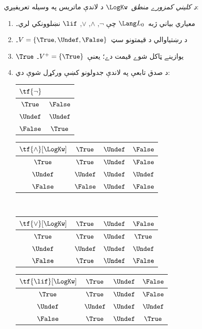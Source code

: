 \documentclass[../../../include/open-logic-section]{subfiles}
\begin{document}
\begin{defn}
\emph{د کليني کمزورے منطق}~$\LogKw$ د لاندې ماتريس په وسيله تعريفېږي:
\begin{enumerate}
  \item معياري بياني ژبه~$\Lang L_0$ چې
  $\lnot$, $\land$, $\lor$, $\lif$ نښلوونکي لري۔
  \item د رښتياوالي د قيمتونو سټ~$V = \{\True, \Undef, \False\}$۔
  \item $\True$ يوازينے ټاکل شوے قيمت دے؛ يعنې~$V^+ = \{\True\}$۔
  \item د صدق تابعې په لاندې جدولونو کښې ورکړل شوې دي:
  \begin{center}
    \begin{tabular}{c|c} 
      $\tf{\lnot}$ & \\ 
      \hline  
      $\True$ & $\False$ \\ 
      $\Undef$ & $\Undef$ \\
      $\False$ & $\True$ 
    \end{tabular}
    \quad
    \begin{tabular}{c|ccc} 
      $\tf{\land}[\LogKw]$ & $\True$ & $\Undef$ & $\False$ \\ 
      \hline 
      $\True$ & $\True$ & $\Undef$ & $\False$ \\ 
      $\Undef$ & $\Undef$ & $\Undef$ & $\Undef$\\ 
      $\False$ & $\False$ & $\Undef$ & $\False$ 
    \end{tabular}
    \\[2ex]
    \begin{tabular}{c|ccc} 
      $\tf{\lor}[\LogKw]$ & $\True$ & $\Undef$ & $\False$ \\ 
      \hline 
      $\True$ & $\True$ & $\Undef$ & $\True$ \\ 
      $\Undef$ & $\Undef$ & $\Undef$ & $\Undef$ \\
      $\False$ & $\True$ & $\Undef$ & $\False$ 
    \end{tabular}
    \quad
    \begin{tabular}{c|ccc} 
      $\tf{\lif}[\LogKw]$ & $\True$ & $\Undef$ & $\False$ \\ 
      \hline 
      $\True$ & $\True$ & $\Undef$ & $\False$ \\ 
      $\Undef$ & $\Undef$ & $\Undef$ & $\Undef$  \\ 
      $\False$ & $\True$ & $\Undef$ & $\True$ 
    \end{tabular}
  \end{center} 
\end{enumerate}
\end{defn}
\end{document}
